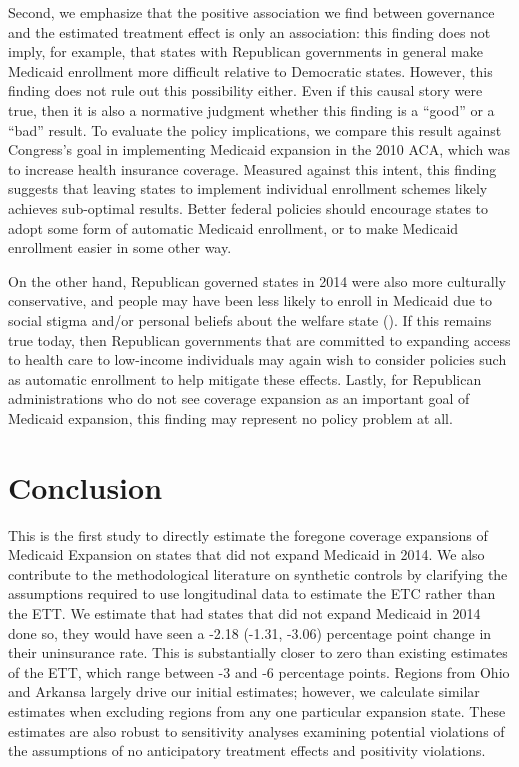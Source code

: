 \documentclass[12pt]{article}
\begin{document}
Second, we emphasize that the positive association we find between governance and the estimated treatment effect is only an association: this finding does not imply, for example, that states with Republican governments in general make Medicaid enrollment more difficult relative to Democratic states. However, this finding does not rule out this possibility either. Even if this causal story were true, then it is also a normative judgment whether this finding is a ``good'' or a ``bad'' result. To evaluate the policy implications, we compare this result against Congress's goal in implementing Medicaid expansion in the 2010 ACA, which was to increase health insurance coverage. Measured against this intent, this finding suggests that leaving states to implement individual enrollment schemes likely achieves sub-optimal results. Better federal policies should encourage states to adopt some form of automatic Medicaid enrollment, or to make Medicaid enrollment easier in some other way.

On the other hand, Republican governed states in 2014 were also more culturally conservative, and people may have been less likely to enroll in Medicaid due to social stigma and/or personal beliefs about the welfare state (\cite{sommers2012understanding}). If this remains true today, then Republican governments that are committed to expanding access to health care to low-income individuals may again wish to consider policies such as automatic enrollment to help mitigate these effects. Lastly, for Republican administrations who do not see coverage expansion as an important goal of Medicaid expansion, this finding may represent no policy problem at all.

\section{Conclusion}

This is the first study to directly estimate the foregone coverage expansions of Medicaid Expansion on states that did not expand Medicaid in 2014. We also contribute to the methodological literature on synthetic controls by clarifying the assumptions required to use longitudinal data to estimate the ETC rather than the ETT. We estimate that had states that did not expand Medicaid in 2014 done so, they would have seen a -2.18 (-1.31, -3.06) percentage point change in their uninsurance rate. This is substantially closer to zero than existing estimates of the ETT, which range between -3 and -6 percentage points. Regions from Ohio and Arkansa largely drive our initial estimates; however, we calculate similar estimates when excluding regions from any one particular expansion state. These estimates are also robust to sensitivity analyses examining potential violations of the assumptions of no anticipatory treatment effects and positivity violations. 
\end{document}
